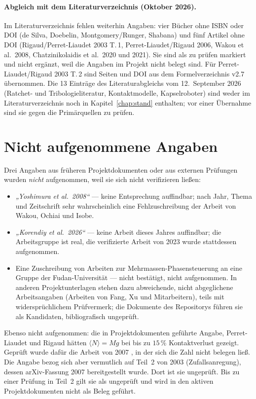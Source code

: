 \documentclass[12pt,a4paper]{report}
\begin{document}
\paragraph{Abgleich mit dem Literaturverzeichnis (Oktober 2026).}
Im Literaturverzeichnis fehlen weiterhin Angaben: vier Bücher ohne ISBN
oder DOI (de Silva, Doebelin, \foreignlanguage{english}{Montgomery/Runger}, Shabana) und fünf
Artikel ohne DOI (Rigaud/Perret-Liaudet 2003 T.\,1, Perret-Liaudet/Rigaud
2006, Wakou et al.\ 2008, Chatzinikolaidis et al.\ 2020 und 2021). Sie
sind als zu prüfen markiert und nicht ergänzt, weil die Angaben im
Projekt nicht belegt sind. Für Perret-Liaudet/Rigaud 2003 T.\,2 sind
Seiten und DOI aus dem Formelverzeichnis v2.7 übernommen. Die
13 Einträge des Literaturabgleichs vom 12.~September 2026 (Ratchet- und
Tribologieliteratur, Kontaktmodelle, Kapselroboter) sind weder im
Literaturverzeichnis noch in Kapitel~\ref{chap:stand} enthalten; vor einer
Übernahme sind sie gegen die Primärquellen zu prüfen.

\section{Nicht aufgenommene Angaben}

Drei Angaben aus früheren Projektdokumenten oder aus externen
Prüfungen wurden \emph{nicht} aufgenommen, weil sie sich nicht
verifizieren ließen:

\begin{itemize}
\item \emph{„Yoshimura et al.\ 2008“} --- keine Entsprechung
      auffindbar; nach Jahr, Thema und Zeitschrift sehr wahrscheinlich
      eine Fehlzuschreibung der Arbeit von Wakou, Ochiai und Isobe.
\item \emph{„Korendiy et al.\ 2026“} --- keine Arbeit dieses Jahres
      auffindbar; die Arbeitsgruppe ist real, die verifizierte Arbeit
      von 2023 wurde stattdessen aufgenommen.
\item Eine Zuschreibung von Arbeiten zur Mehrmassen-Phasensteuerung an
      eine Gruppe der Fudan-Universität --- nicht bestätigt, nicht
      aufgenommen. In anderen Projektunterlagen stehen dazu abweichende,
      nicht abgeglichene Arbeitsangaben (Arbeiten von Fang, Xu und
      Mitarbeitern), teils mit widersprüchlichem Prüfvermerk; die
      Dokumente des Repositorys führen sie als Kandidaten, bibliografisch
      ungeprüft.
\end{itemize}

Ebenso nicht aufgenommen: die in Projektdokumenten geführte Angabe,
Perret-Liaudet und Rigaud hätten $\langle N \rangle = Mg$ bei bis zu
$15\,\%$ Kontaktverlust gezeigt. Geprüft wurde dafür die Arbeit von 2007
\cite{perretliaudet2007}, in der sich die Zahl nicht belegen ließ. Die
Angabe bezog sich aber vermutlich auf Teil~2 von 2003
\cite{perretliaudet2003} (Zufallsanregung), dessen arXiv-Fassung 2007
bereitgestellt wurde. Dort ist sie ungeprüft. Bis zu einer Prüfung in
Teil~2 gilt sie als ungeprüft und wird in den aktiven Projektdokumenten
nicht als Beleg geführt.
\end{document}
